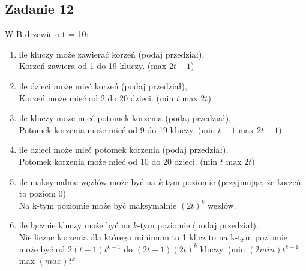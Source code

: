 \documentclass{article}
\begin{document}
\subsection*{Zadanie 12}
W B-drzewie o t = 10:
\begin{enumerate}[label=(\alph*)]
    \item ile kluczy może zawierać korzeń (podaj przedział), \\
          Korzeń zawiera od 1 do 19 kluczy. (max $2t-1$)
    \item ile dzieci może mieć korzeń (podaj przedział), \\
          Korzeń może mieć od 2 do 20 dzieci. (min $t$ max $2t$)
    \item ile kluczy może mieć potomek korzenia (podaj przedział), \\
          Potomek korzenia może mieć od 9 do 19 kluczy. (min $t-1$ max $2t-1$)
    \item ile dzieci może mieć potomek korzenia (podaj przedział), \\
          Potomek korzenia może mieć od 10 do 20 dzieci. (min $t$ max $2t$)
    \item ile maksymalnie węzłów może być na $k$-tym poziomie (przyjmując, że korzeń to poziom $0$) \\
          Na k-tym poziomie może być maksymalnie $(2t)^k$ węzłów.
    \item ile łącznie kluczy może być na $k$-tym poziomie (podaj przedział). \\
          Nie licząc korzenia dla którego minimum to 1 klicz to na k-tym poziomie może być od $2(t-1)t^{k-1}$ do $(2t-1)(2t)^{k}$ kluczy. (min $(2min)t^{k-1}$ max $(max)t^{k}$
\end{enumerate}
\end{document}
